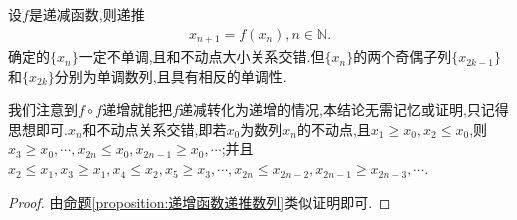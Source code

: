 \documentclass[../../main.tex]{subfiles}%
\begin{document}
\begin{proposition}[递减函数递推数列]\label{proposition:递减函数递推数列}
设\(f\)是递减函数,则递推
\begin{align}\label{equation:486561}
x_{n + 1} = f(x_n),n \in \mathbb{N}.
\end{align}
确定的\(\{x_n\}\)一定不单调,且和不动点大小关系交错.但$\{x_n\}$的两个奇偶子列$\{x_{2k-1}\}$和$\{x_{2k}\}$分别为单调数列,且具有相反的单调性.
\end{proposition}
\begin{note}
我们注意到\(f\circ f\)递增就能把\(f\)递减转化为递增的情况,本结论无需记忆或证明,只记得思想即可.$x_n$和不动点关系交错,即若$x_0$为数列${x_n}$的不动点,且$x_1\geqslant  x_0,x_2\leqslant  x_0$,则$x_3 \geqslant  x_0,\cdots,x_{2n}\leqslant  x_0,x_{2n-1}\geqslant  x_0,\cdots$;并且$x_2\leqslant  x_1,x_3\geqslant  x_1,x_4\leqslant  x_2,x_5\geqslant  x_3,\cdots,x_{2n}\leqslant  x_{2n-2},x_{2n-1}\geqslant  x_{2n-3},\cdots$.
\end{note}
\begin{proof}
由\hyperref[proposition:递增函数递推数列]{命题\ref{proposition:递增函数递推数列}}类似证明即可.
\end{proof}
\end{document}
